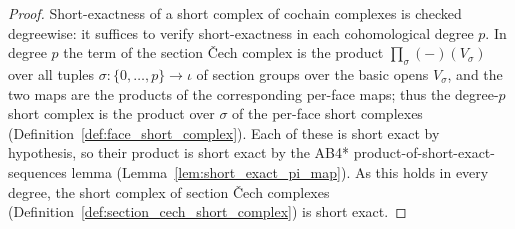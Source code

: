 \begin{proof}
  \leanok
  Short-exactness of a short complex of cochain complexes is checked degreewise: it suffices to
  verify short-exactness in each cohomological degree \(p\). In degree \(p\) the term of the
  section {\v C}ech complex is the product \(\prod_{\sigma}(-)(V_\sigma)\) over all tuples
  \(\sigma : \{0, \ldots, p\} \to \iota\) of section groups over the basic opens \(V_\sigma\), and
  the two maps are the products of the corresponding per-face maps; thus the degree-\(p\) short
  complex is the product over \(\sigma\) of the per-face short complexes
  (Definition~\ref{def:face_short_complex}). Each of these is short exact by hypothesis, so their
  product is short exact by the AB4* product-of-short-exact-sequences lemma
  (Lemma~\ref{lem:short_exact_pi_map}). As this holds in every degree, the short complex of section
  {\v C}ech complexes (Definition~\ref{def:section_cech_short_complex}) is short exact.
\end{proof}

